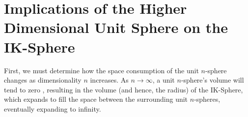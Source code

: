 

\section{Implications of the Higher Dimensional Unit Sphere on the IK-Sphere}
First, we must determine how the space consumption of the unit $n$-sphere changes as dimensionality $n$ increases. As $n \to \infty$, a unit $n$-sphere's volume will tend to zero \cite{athreya2008unit}, resulting in the volume (and hence, the radius) of the IK-Sphere, which expands to fill the space between the surrounding unit $n$-spheres, eventually expanding to infinity. 

